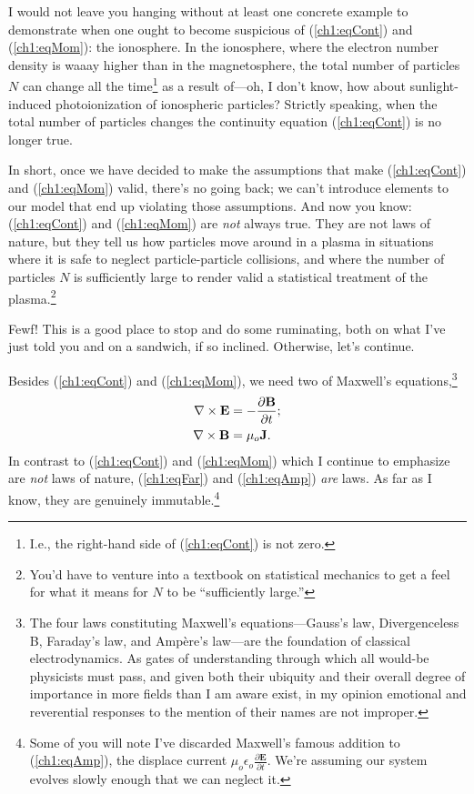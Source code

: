 I would not leave you hanging without at least one concrete example to
demonstrate when one ought to become suspicious of (\ref{ch1:eqCont}) and
(\ref{ch1:eqMom}): the ionosphere. In the ionosphere, where the electron number
density is waaay higher than in the magnetosphere, the total number of particles
$N$ can change all the time\footnote{I.e., the right-hand side of
  (\ref{ch1:eqCont}) is not zero.} as a result of---oh, I don't know, how about
sunlight-induced photoionization of ionospheric particles? Strictly speaking,
when the total number of particles changes the continuity equation
(\ref{ch1:eqCont}) is no longer true.

In short, once we have decided to make the assumptions that make
(\ref{ch1:eqCont}) and (\ref{ch1:eqMom}) valid, there's no going back; we can't
introduce elements to our model that end up violating those assumptions. And now
you know: (\ref{ch1:eqCont}) and (\ref{ch1:eqMom}) are \emph{not} always
true. They are not laws of nature, but they tell us how particles move around in
a plasma in situations where it is safe to neglect particle-particle collisions,
and where the number of particles $N$ is sufficiently large to render valid a
statistical treatment of the plasma.\footnote{You'd have to venture into a
  textbook on statistical mechanics to get a feel for what it means for $N$ to
  be ``sufficiently large.''}

Fewf! This is a good place to stop and do some ruminating, both on what I've
just told you and on a sandwich, if so inclined. Otherwise, let's continue.

Besides (\ref{ch1:eqCont}) and (\ref{ch1:eqMom}), we need two of Maxwell's
equations,\footnote{The four laws constituting Maxwell's equations---Gauss's
  law, Divergenceless B, Faraday's law, and Amp\`{e}re's law---are the
  foundation of classical electrodynamics. As gates of understanding through
  which all would-be physicists must pass, and given both their ubiquity and
  their overall degree of importance in more fields than I am aware exist, in my
  opinion emotional and reverential responses to the mention of their names are
  not improper.}
\begin{subequations}
  \begin{align} {\bf \nabla} \times \mathbf{E} &= - \dfrac{\partial \mathbf{B}}{\partial t}; \label{ch1:eqFar} \\
    {\bf \nabla} \times \mathbf{B} &= \mu_o \mathbf{J}. \label{ch1:eqAmp}
  \end{align}
\end{subequations}
In contrast to (\ref{ch1:eqCont}) and (\ref{ch1:eqMom}) which I continue to
emphasize are \emph{not} laws of nature, (\ref{ch1:eqFar}) and (\ref{ch1:eqAmp})
\emph{are} laws. As far as I know, they are genuinely immutable.\footnote{Some
  of you will note I've discarded Maxwell's famous addition to
  (\ref{ch1:eqAmp}), the displace current $\mu_o \epsilon_o \frac{\partial
    \mathbf{E}}{\partial t}$. We're assuming our system evolves slowly enough
  that we can neglect it.}

